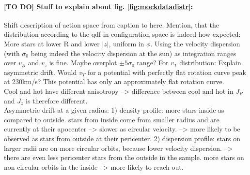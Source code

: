 \documentclass[12pt,preprint]{aastex}
\begin{document}
\paragraph{[TO DO] Stuff to explain about fig. \ref{fig:mockdatadistr}:} Shift description of action space from caption to here. Mention, that the distribution according to the qdf in configuration space is indeed how expected: More stars at lower R and lower $|z|$, uniform in $\phi$. Using the velocity dispersion (with $\sigma_0$ being indeed the velocity dispersion at the sun) as integration ranges over $v_R$ and $v_z$ is fine. Maybe overplot $\pm5\sigma_0$ range? For $v_T$ distribution: Explain asymmetric drift. Would $v_T$ for a potential with perfectly flat rotation curve peak at 230km/s? This potential has only an approximately flat rotation curve.\\Cool and hot have different anisotropy --> difference between cool and hot in $J_R$ and $J_z$ is therefore different. \\Asymmetric drift at a given radius: 1) density profile: more stars inside as compared to outside. stars from inside come from smaller radius and are currently at their apocenter --> slower as circular velocity. --> more likely to be observed as stars from outside at their pericenter. 2) dispersion profile: stars on larger radii are on more circular orbits, because lower velocity dispersion. --> there are even less pericenter stars from the outside in the sample. more stars on non-circular orbits in the inside --> more likely to reach out.


\end{document}

